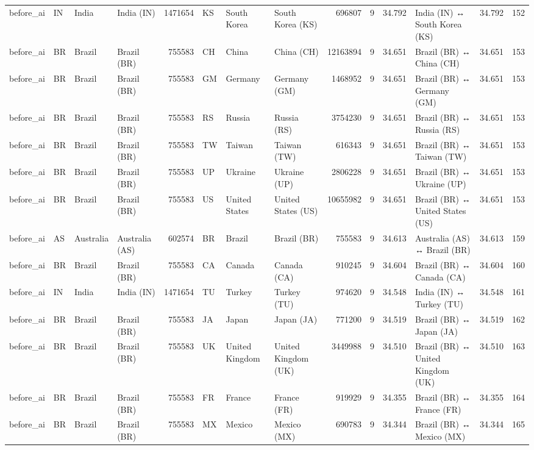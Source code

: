 \begin{tabular}{llllrlllrrrlrr}
before\_ai & IN & India & India (IN) & 1471654 & KS & South Korea & South Korea (KS) & 696807 & 9 & 34.792 & India (IN) ↔ South Korea (KS) & 34.792 & 152 \\
before\_ai & BR & Brazil & Brazil (BR) & 755583 & CH & China & China (CH) & 12163894 & 9 & 34.651 & Brazil (BR) ↔ China (CH) & 34.651 & 153 \\
before\_ai & BR & Brazil & Brazil (BR) & 755583 & GM & Germany & Germany (GM) & 1468952 & 9 & 34.651 & Brazil (BR) ↔ Germany (GM) & 34.651 & 153 \\
before\_ai & BR & Brazil & Brazil (BR) & 755583 & RS & Russia & Russia (RS) & 3754230 & 9 & 34.651 & Brazil (BR) ↔ Russia (RS) & 34.651 & 153 \\
before\_ai & BR & Brazil & Brazil (BR) & 755583 & TW & Taiwan & Taiwan (TW) & 616343 & 9 & 34.651 & Brazil (BR) ↔ Taiwan (TW) & 34.651 & 153 \\
before\_ai & BR & Brazil & Brazil (BR) & 755583 & UP & Ukraine & Ukraine (UP) & 2806228 & 9 & 34.651 & Brazil (BR) ↔ Ukraine (UP) & 34.651 & 153 \\
before\_ai & BR & Brazil & Brazil (BR) & 755583 & US & United States & United States (US) & 10655982 & 9 & 34.651 & Brazil (BR) ↔ United States (US) & 34.651 & 153 \\
before\_ai & AS & Australia & Australia (AS) & 602574 & BR & Brazil & Brazil (BR) & 755583 & 9 & 34.613 & Australia (AS) ↔ Brazil (BR) & 34.613 & 159 \\
before\_ai & BR & Brazil & Brazil (BR) & 755583 & CA & Canada & Canada (CA) & 910245 & 9 & 34.604 & Brazil (BR) ↔ Canada (CA) & 34.604 & 160 \\
before\_ai & IN & India & India (IN) & 1471654 & TU & Turkey & Turkey (TU) & 974620 & 9 & 34.548 & India (IN) ↔ Turkey (TU) & 34.548 & 161 \\
before\_ai & BR & Brazil & Brazil (BR) & 755583 & JA & Japan & Japan (JA) & 771200 & 9 & 34.519 & Brazil (BR) ↔ Japan (JA) & 34.519 & 162 \\
before\_ai & BR & Brazil & Brazil (BR) & 755583 & UK & United Kingdom & United Kingdom (UK) & 3449988 & 9 & 34.510 & Brazil (BR) ↔ United Kingdom (UK) & 34.510 & 163 \\
before\_ai & BR & Brazil & Brazil (BR) & 755583 & FR & France & France (FR) & 919929 & 9 & 34.355 & Brazil (BR) ↔ France (FR) & 34.355 & 164 \\
before\_ai & BR & Brazil & Brazil (BR) & 755583 & MX & Mexico & Mexico (MX) & 690783 & 9 & 34.344 & Brazil (BR) ↔ Mexico (MX) & 34.344 & 165 \\

\end{tabular}
